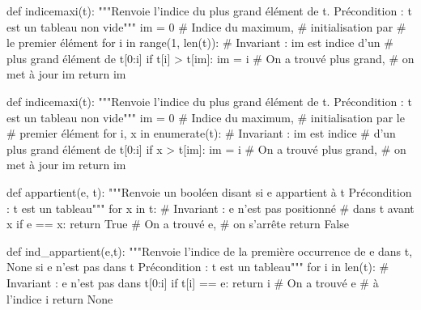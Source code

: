 \begin{multicols}{2}
\begin{pyverbatim}
def indicemaxi(t):
    """Renvoie l'indice du plus grand 
        élément de t.
       Précondition : t est un tableau 
       non vide"""
    im = 0 # Indice du maximum, 
           # initialisation par 
           # le premier élément
    for i in range(1, len(t)):
        # Invariant : im est indice d'un 
        # plus grand élément de t[0:i]
        if t[i] > t[im]:
            im = i # On a trouvé plus grand, 
                   # on met à jour im
    return im
    
\end{pyverbatim}



\begin{pyverbatim}
def indicemaxi(t):
    """Renvoie l'indice du plus grand élément 
       de t.
       Précondition : t est un tableau 
       non vide"""
    im = 0 # Indice du maximum, 
            # initialisation par le 
            # premier élément
    for i, x in enumerate(t):
        # Invariant : im est indice 
        # d'un plus grand élément de t[0:i]
        if x > t[im]:
            im = i # On a trouvé plus grand, 
                    # on met à jour im
    return im
\end{pyverbatim}



\begin{pyverbatim}
def appartient(e, t):
    """Renvoie un booléen disant si e 
    appartient à t
       Précondition : t est un tableau"""
    for x in t:
        # Invariant : e n'est pas positionné 
        # dans t avant x
        if e == x:
            return True # On a trouvé e, 
                      # on s'arrête
    return False
 
\end{pyverbatim}

\begin{pyverbatim}
def ind_appartient(e,t):
    """Renvoie l'indice de la première 
       occurrence de e dans t,
       None si e n'est pas dans t
       Précondition : t est un tableau"""
    for i in len(t):
        # Invariant : e n'est pas dans t[0:i]
        if t[i] == e:
            return i # On a trouvé e 
                   # à l'indice i
    return None
\end{pyverbatim}

\end{multicols}